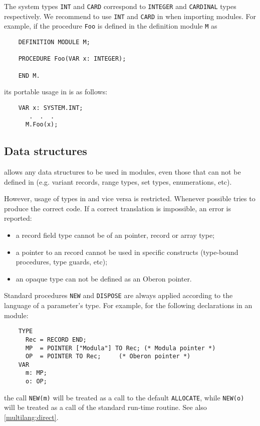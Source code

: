 The system types {\tt INT} and {\tt CARD} correspond to
\mt{} {\tt INTEGER} and {\tt CARDINAL} types respectively.
We recommend to use {\tt INT} and {\tt CARD} in \ot{} when importing \mt{}
modules. For example, if the procedure {\tt Foo} is defined
in the \mt{} definition module \verb'M' as
\begin{verbatim}
    DEFINITION MODULE M;

    PROCEDURE Foo(VAR x: INTEGER);

    END M.
\end{verbatim}
its portable usage in \ot{} is as follows:
\begin{verbatim}
    VAR x: SYSTEM.INT;
       .  .  .
      M.Foo(x);
\end{verbatim}

\subsection{Data structures}

\xds{} allows any \mt{} data structures to be used in \ot{}
modules, even those that can not be defined in \ot{} (e.g.
variant records, range types, set types, enumerations, etc).

However, usage of \mt{} types in \ot{} and vice versa is
restricted. Whenever possible \xds{} tries to produce the correct
code. If a correct translation is impossible, an error
is reported:
\begin{itemize}
\item
  a \mt{} record field type cannot be of an \ot{} pointer, record
  or array type;
\item
  a \mt{} pointer to an \ot{} record cannot  be  used  in  specific
  \ot{} constructs (type-bound procedures, type guards, etc);
\item
   an opaque type can not be defined as an Oberon pointer.
\end{itemize}

Standard procedures \verb'NEW' and \verb'DISPOSE' are always applied according to
the language of a parameter's type. For example, for the following
declarations in an \ot{} module:
\begin{verbatim}
    TYPE
      Rec = RECORD END;
      MP  = POINTER ["Modula"] TO Rec; (* Modula pointer *)
      OP  = POINTER TO Rec;     (* Oberon pointer *)
    VAR
      m: MP;
      o: OP;
\end{verbatim}
the call \verb|NEW(m)| will be treated as a call to the \mt{}
default {\tt ALLOCATE}, while \verb|NEW(o)| will be treated as
a call of the standard \ot{} run-time routine.
See also \ref{multilang:direct}.

